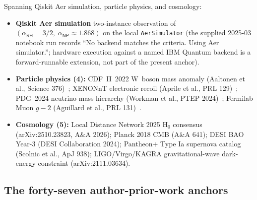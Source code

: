 \documentclass[11pt,a4paper]{amsart}
\theoremstyle{plain}
\theoremstyle{definition}
\begin{document}
Spanning Qiskit Aer simulation, particle physics, and cosmology:
\begin{itemize}[itemsep=2pt]
\item \textbf{Qiskit Aer simulation} two-instance observation of $(\alpha_{\textsf{RH}}=3/2,\;\alpha_{\textsf{NP}}\approx 1.868)$ on the local \texttt{AerSimulator} (the supplied 2025-03 notebook run records ``No backend matches the criteria. Using Aer simulator.''; hardware execution against a named IBM Quantum backend is a forward-runnable extension, not part of the present anchor).
\item \textbf{Particle physics (4):} CDF~II~2022 W~boson mass anomaly (Aaltonen et al., Science 376)~\cite{cdf2022wboson}; XENONnT electronic recoil (Aprile et al., PRL 129)~\cite{xenon-collab}; PDG~2024 neutrino mass hierarchy (Workman et al., PTEP 2024)~\cite{pdg2024}; Fermilab Muon $g-2$ (Aguillard et al., PRL 131)~\cite{fermilab-muon-g-2}.
\item \textbf{Cosmology (5):} Local Distance Network 2025 H$_0$ consensus (arXiv:2510.23823, A\&A 2026); Planck 2018 CMB (A\&A 641); DESI BAO Year-3 (DESI Collaboration 2024); Pantheon$+$ Type Ia supernova catalog (Scolnic et al., ApJ 938); LIGO/Virgo/KAGRA gravitational-wave dark-energy constraint (arXiv:2111.03634).
\end{itemize}

\subsection{The forty-seven author-prior-work anchors}
\end{document}
